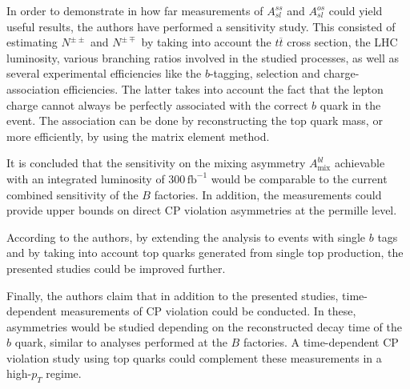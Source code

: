 In order to demonstrate in how far measurements of $A^{ss}_{sl}$ and $A^{os}_{sl}$ could yield useful results, the authors have performed a sensitivity study.
This consisted of estimating $N^{\pm\pm}$ and $N^{\pm\mp}$ by taking into account the $t\overline{t}$ cross section, the LHC luminosity, various branching ratios involved in the studied processes, as well as several experimental efficiencies like the $b$-tagging, selection and charge-association efficiencies.
The latter takes into account the fact that the lepton charge cannot always be perfectly associated with the correct $b$ quark in the event.
The association can be done by reconstructing the top quark mass, or more efficiently, by using the matrix element method.

It is concluded that the sensitivity on the mixing asymmetry $A^{bl}_\text{mix}$ achievable with an integrated luminosity of $300\,\text{fb}^{-1}$ would be comparable to the current combined sensitivity of the $B$ factories.
In addition, the measurements could provide upper bounds on direct CP violation asymmetries at the permille level.

According to the authors, by extending the analysis to events with single $b$ tags and by taking into account top quarks generated from single top production, the presented studies could be improved further.

Finally, the authors claim that in addition to the presented studies, time-dependent measurements of CP violation could be conducted.
In these, asymmetries would be studied depending on the reconstructed decay time of the $b$ quark, similar to analyses performed at the $B$ factories.
A time-dependent CP violation study using top quarks could complement these measurements in a high-$p_T$ regime.

\vspace{1em}

\nocite{*}
\printbibliography


